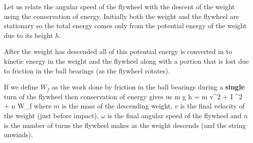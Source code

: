     Let us relate the angular speed of the flywheel with the descent of the weight using the conservation of energy. Initially both the weight and the flywheel are stationary so the total energy comes only from the potential energy of the weight due to its height $h$.

    After the weight has descended all of this potential energy is converted in to kinetic energy in the weight and the flywheel along with a portion that is lost due to friction in the ball bearings (as the flywheel rotates).

    If we define $W_f$ as the work done by friction in the ball bearings during a \textbf{single} turn of the flywheel then conservation of energy gives us
    \beq
        m g h =  m v^2 +  I \omega^2 + n W_f
    \eeq
    where $m$ is the mass of the descending weight, $v$ is the final velocity of the weight (just before impact), $\omega$ is the final angular speed of the flywheel and $n$ is the number of turns the flywheel makes as the weight descends (and the string unwinds).
